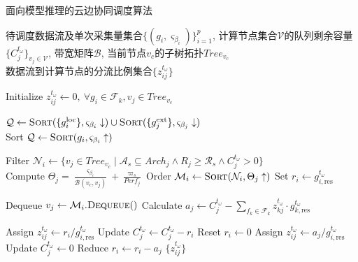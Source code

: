\begin{breakablealgorithm}
\caption{面向模型推理的云边协同调度算法}
\label{alg:cluster_scheduling}
\begin{algorithmic}[1]
\REQUIRE  
  待调度数据流及单次采集量集合$\{(g_i, \varsigma_{\beta_i})\}_{i=1}^p$, 
  计算节点集合$\mathcal{V}$的队列剩余容量$\{C^{t_\omega}_j\}_{v_j \in \mathcal{V}}$, 带宽矩阵$\mathcal{B}$, 当前节点$v_c$的子树拓扑$Tree_{v_c}$ \\ 
\ENSURE  
  数据流到计算节点的分流比例集合$\{z_{ij}^{t_\omega}\}$
  
\STATE Initialize $z_{ij}^{t_\omega} \leftarrow 0,\ \forall g_i \in \mathcal{F}_k, v_j \in Tree_{v_c}$  

\STATE $\mathcal{Q} \leftarrow \textsc{Sort}(\{g_i^{\text{loc}}\}, \varsigma_{\beta_i} \downarrow) \cup \textsc{Sort}(\{g_j^{\text{ext}}\}, \varsigma_{\beta_j} \downarrow)$
  \\ 
\STATE Sort $\mathcal{Q} \leftarrow \textsc{Sort}( g_i, \varsigma_{\beta_i} \uparrow)$ 
\ENDIF

  \STATE Filter $\mathcal{N}_i \leftarrow \{v_j \in Tree_{v_c} \mid \mathcal{A}_s \subseteq Arch_j \wedge R_j \geq \mathcal{R}_s \wedge C^{t_\omega}_j > 0\}$  
    \\ 
  \STATE Compute $\Theta_j = \frac{\varsigma_{\beta_i}}{\mathcal{B}(v_c,v_j)} + \frac{\varpi_s}{Perf_j}$
  \STATE Order $\mathcal{M}_i \leftarrow \textsc{Sort}(\mathcal{N}_i, \Theta_j \uparrow)$  
  \STATE Set $r_i \leftarrow g_{i,\text{res}}^{t_\omega}$

    \STATE Dequeue $v_j \leftarrow \mathcal{M}_i.\textsc{Dequeue}()$
    \STATE Calculate $a_j \leftarrow C^{t_\omega}_j - \sum_{f_k \in \mathcal{F}_k} z_{kj}^{t_\omega} \cdot g_{k,\text{res}}^{t_\omega}$
    
      \STATE Assign $z_{ij}^{t_\omega} \leftarrow r_i / g_{i,\text{res}}^{t_\omega}$  
      \STATE Update $C^{t_\omega}_j \leftarrow C^{t_\omega}_j - r_i$
      \STATE Reset $r_i \leftarrow 0$
    \ELSE
      \STATE Assign $z_{ij}^{t_\omega} \leftarrow a_j / g_{i,\text{res}}^{t_\omega}$  
      \STATE Update $C^{t_\omega}_j \leftarrow 0$
      \STATE Reduce $r_i \leftarrow r_i - a_j$
    \ENDIF
  \ENDWHILE
\ENDFOR
\RETURN $\{z_{ij}^{t_\omega}\}$
\end{algorithmic}
\end{breakablealgorithm}

